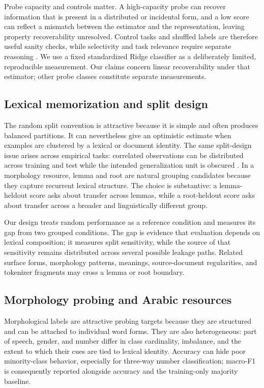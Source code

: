 \documentclass[pdflatex,sn-basic]{sn-jnl}
\begin{document}
Probe capacity and controls matter. A high-capacity probe can recover
information that is present in a distributed or incidental form, and a low
score can reflect a mismatch between the estimator and the representation,
leaving property recoverability unresolved. Control tasks and shuffled labels are
therefore useful sanity checks, while selectivity and task relevance require
separate reasoning \citep{hewitt-liang-2019,ravichander-etal-2021}. We use a
fixed standardized Ridge classifier as a deliberately limited, reproducible
measurement. Our claims concern linear recoverability under that estimator;
other probe classes constitute separate measurements.

\subsection{Lexical memorization and split design}

The random split convention is attractive because it is simple and often
produces balanced partitions. It can nevertheless give an optimistic estimate
when examples are clustered by a lexical or document identity. The same
split-design issue arises across empirical tasks: correlated observations can
be distributed across training and test while the intended generalization unit is
obscured \citep{gorman-bedrick-2019,sogaard-etal-2021}. In a
morphology resource, lemma and root are natural grouping candidates because
they capture recurrent lexical structure. The choice is substantive: a
lemma-heldout score asks about transfer across lemmas, while a root-heldout
score asks about transfer across a broader and linguistically different group.

Our design treats random performance as a reference condition and measures its
gap from two grouped conditions. The gap is evidence that evaluation depends on
lexical composition; it measures split sensitivity, while the source of that
sensitivity remains distributed across several possible leakage paths. Related
surface forms, morphology patterns, meanings, source-document regularities,
and tokenizer fragments may cross a lemma or root boundary.

\subsection{Morphology probing and Arabic resources}

Morphological labels are attractive probing targets because they are structured
and can be attached to individual word forms. They are also heterogeneous:
part of speech, gender, and number differ in class cardinality, imbalance, and
the extent to which their cues are tied to lexical identity. Accuracy can hide
poor minority-class behavior, especially for three-way number classification;
macro-F1 is consequently reported alongside accuracy and the training-only
majority baseline.
\end{document}

